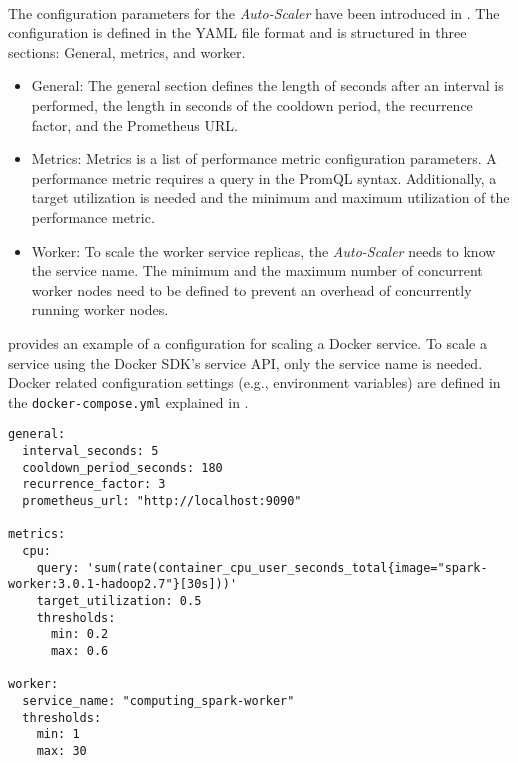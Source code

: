 \paragraph{}
The configuration parameters for the \textit{Auto-Scaler} have been introduced in .
The configuration is defined in the YAML file format and is structured in three sections: General, metrics, and worker.
\begin{itemize}
\item General:
The general section defines the length of seconds after an interval is performed, the length in seconds of the cooldown period, the recurrence factor, and the Prometheus URL.

\item Metrics:
Metrics is a list of performance metric configuration parameters. A performance metric requires a query in the PromQL syntax. Additionally, a target utilization is needed and the minimum and maximum utilization of the performance metric.

\item Worker:
To scale the worker service replicas, the \textit{Auto-Scaler} needs to know the service name. The minimum and the maximum number of concurrent worker nodes need to be defined to prevent an overhead of concurrently running worker nodes.
\end{itemize}
 provides an example of a configuration for scaling a Docker service.
%
To scale a service using the Docker SDK's service API, only the service name is needed.
%
Docker related configuration settings (e.g., environment variables) are defined in the \texttt{docker-compose.yml} explained in .
\begin{lstlisting}[label=lst:06_auto-scaler_config_service_example, caption=\textit{Auto-Scaler} configuration for scaling Docker Services]
general:
  interval_seconds: 5
  cooldown_period_seconds: 180
  recurrence_factor: 3
  prometheus_url: "http://localhost:9090"
 
metrics:
  cpu:
    query: 'sum(rate(container_cpu_user_seconds_total{image="spark-worker:3.0.1-hadoop2.7"}[30s]))'
    target_utilization: 0.5
    thresholds:
      min: 0.2
      max: 0.6
 
worker:
  service_name: "computing_spark-worker"
  thresholds:
    min: 1
    max: 30
\end{lstlisting}


